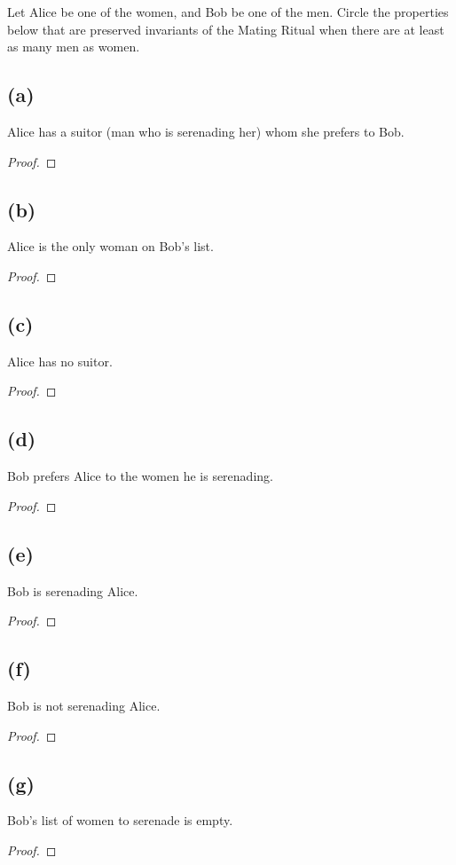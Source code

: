 \documentclass[14pt]{extarticle}
\begin{document}
Let Alice be one of the women, and Bob be one of the men. Circle the properties below that are preserved invariants of the Mating Ritual when there are at least as many men as women.
\subsection{(a)}
Alice has a suitor (man who is serenading her) whom she prefers to Bob.
\begin{proof}
\end{proof}

\subsection{(b)}
Alice is the only woman on Bob's list.
\begin{proof}
\end{proof}

\subsection{(c)}
Alice has no suitor.
\begin{proof}
\end{proof}

\subsection{(d)}
Bob prefers Alice to the women he is serenading.
\begin{proof}
\end{proof}

\subsection{(e)}
Bob is serenading Alice.
\begin{proof}
\end{proof}

\subsection{(f)}
Bob is not serenading Alice.
\begin{proof}
\end{proof}

\subsection{(g)}
Bob's list of women to serenade is empty.
\begin{proof}
\end{proof}
\end{document}
